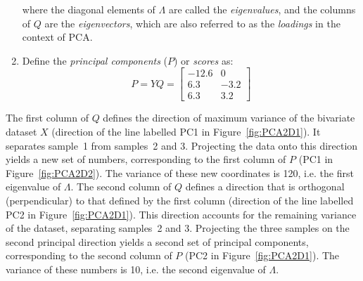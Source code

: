\begin{enumerate}
  where the diagonal elements of $\Lambda$ are called the
  \emph{eigenvalues}, and the columns of $Q$ are the
  \emph{eigenvectors}, which are also referred to as the
  \emph{loadings} in the context of PCA.

\item Define the \emph{principal components} ($P$) or \emph{scores}
  as:
  \begin{equation}
    P = Y Q = 
    \left[
      \begin{array}{cc}
        -12.6 &  0 \\
          6.3 & -3.2 \\
          6.3 &  3.2
      \end{array}
      \right]
    \label{eq:P}
  \end{equation}

\end{enumerate}

The first column of $Q$ defines the direction of maximum variance of
the bivariate dataset $X$ (direction of the line labelled PC1 in
Figure~\ref{fig:PCA2D1}).  It separates sample~1 from samples~2 and
3. Projecting the data onto this direction yields a new set of
numbers, corresponding to the first column of $P$ (PC1 in
Figure~\ref{fig:PCA2D2}). The variance of these new coordinates is
120, i.e. the first eigenvalue of $\Lambda$. The second column of $Q$
defines a direction that is orthogonal (perpendicular) to that defined
by the first column (direction of the line labelled PC2 in
Figure~\ref{fig:PCA2D1}). This direction accounts for the remaining
variance of the dataset, separating samples~2 and 3. Projecting the
three samples on the second principal direction yields a second set of
principal components, corresponding to the second column of $P$ (PC2
in Figure~\ref{fig:PCA2D1}). The variance of these numbers is 10,
i.e. the second eigenvalue of $\Lambda$.

